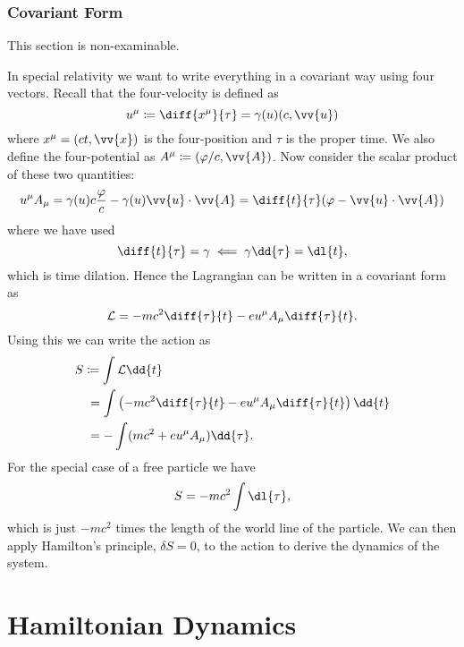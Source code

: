 \documentclass[fleqn]{NotesClass}
\newcommand*{\lagrangian}{\mathcal{L}}
\begin{document}
    \subsection{Covariant Form}
    \begin{rmk}
        This section is non-examinable.
    \end{rmk}
    
    In special relativity we want to write everything in a covariant way using four vectors.
    Recall that the four-velocity is defined as
    \begin{equation}
        u^\mu \coloneqq \diff{x^\mu}{\tau} = \gamma(u)(c, \vv{u})
    \end{equation}
    where \(x^\mu = (ct, \vv{x})\) is the four-position and \(\tau\) is the proper time.
    We also define the four-potential as \(A^\mu \coloneqq (\varphi/c, \vv{A})\).
    Now consider the scalar product of these two quantities:
    \begin{align}
        u^\mu A_\mu = \gamma(u)c\frac{\varphi}{c} - \gamma(u)\vv{u}\cdot\vv{A} = \diff{t}{\tau}(\varphi - \vv{u}\cdot\vv{A})
    \end{align}
    where we have used
    \begin{equation}
        \diff{t}{\tau} = \gamma \impliedby \gamma\dd{\tau} = \dl{t},
    \end{equation}
    which is time dilation.
    Hence the Lagrangian can be written in a covariant form as
    \begin{equation}
        \lagrangian = -mc^2\diff{\tau}{t} - eu^\mu A_\mu \diff{\tau}{t}.
    \end{equation}
    Using this we can write the action as
    \begin{align}
        S &\coloneqq \int \lagrangian \dd{t}\\
        &\hphantom{:}= \int \left( -mc^2\diff{\tau}{t} - eu^\mu A_\mu \diff{\tau}{t} \right)\dd{t}\\
        &\hphantom{:}= -\int (mc^2 + eu^\mu A_\mu) \dd{\tau}.
    \end{align}
    For the special case of a free particle we have
    \begin{equation}
        S = -mc^2 \int \dl{\tau},
    \end{equation}
    which is just \(-mc^2\) times the length of the world line of the particle.
    We can then apply Hamilton's principle, \(\delta S = 0\), to the action to derive the dynamics of the system.
    
    \chapter{Hamiltonian Dynamics}
\end{document}
